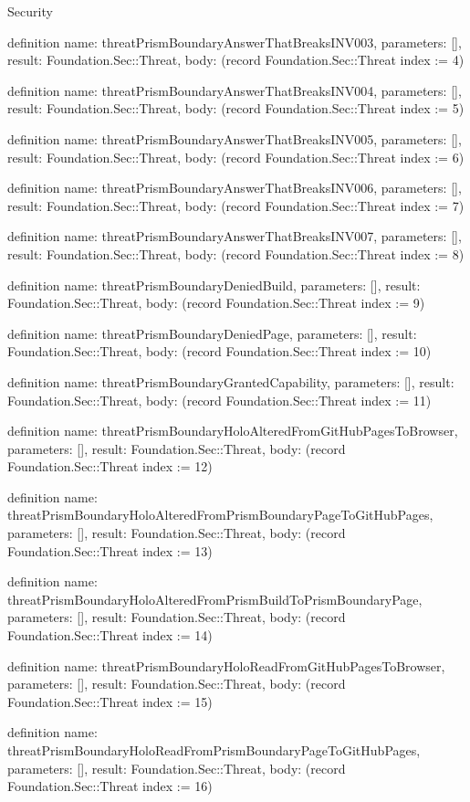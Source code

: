 \begin{lexlean}{Security}
\begin{semanticmodule}
definition{
  name: threatPrismBoundaryAnswerThatBreaksINV003,
  parameters: [],
  result: Foundation.Sec::Threat,
  body: (record Foundation.Sec::Threat {index := 4})
}

definition{
  name: threatPrismBoundaryAnswerThatBreaksINV004,
  parameters: [],
  result: Foundation.Sec::Threat,
  body: (record Foundation.Sec::Threat {index := 5})
}

definition{
  name: threatPrismBoundaryAnswerThatBreaksINV005,
  parameters: [],
  result: Foundation.Sec::Threat,
  body: (record Foundation.Sec::Threat {index := 6})
}

definition{
  name: threatPrismBoundaryAnswerThatBreaksINV006,
  parameters: [],
  result: Foundation.Sec::Threat,
  body: (record Foundation.Sec::Threat {index := 7})
}

definition{
  name: threatPrismBoundaryAnswerThatBreaksINV007,
  parameters: [],
  result: Foundation.Sec::Threat,
  body: (record Foundation.Sec::Threat {index := 8})
}

definition{
  name: threatPrismBoundaryDeniedBuild,
  parameters: [],
  result: Foundation.Sec::Threat,
  body: (record Foundation.Sec::Threat {index := 9})
}

definition{
  name: threatPrismBoundaryDeniedPage,
  parameters: [],
  result: Foundation.Sec::Threat,
  body: (record Foundation.Sec::Threat {index := 10})
}

definition{
  name: threatPrismBoundaryGrantedCapability,
  parameters: [],
  result: Foundation.Sec::Threat,
  body: (record Foundation.Sec::Threat {index := 11})
}

definition{
  name: threatPrismBoundaryHoloAlteredFromGitHubPagesToBrowser,
  parameters: [],
  result: Foundation.Sec::Threat,
  body: (record Foundation.Sec::Threat {index := 12})
}

definition{
  name: threatPrismBoundaryHoloAlteredFromPrismBoundaryPageToGitHubPages,
  parameters: [],
  result: Foundation.Sec::Threat,
  body: (record Foundation.Sec::Threat {index := 13})
}

definition{
  name: threatPrismBoundaryHoloAlteredFromPrismBuildToPrismBoundaryPage,
  parameters: [],
  result: Foundation.Sec::Threat,
  body: (record Foundation.Sec::Threat {index := 14})
}

definition{
  name: threatPrismBoundaryHoloReadFromGitHubPagesToBrowser,
  parameters: [],
  result: Foundation.Sec::Threat,
  body: (record Foundation.Sec::Threat {index := 15})
}

definition{
  name: threatPrismBoundaryHoloReadFromPrismBoundaryPageToGitHubPages,
  parameters: [],
  result: Foundation.Sec::Threat,
  body: (record Foundation.Sec::Threat {index := 16})
}


\end{semanticmodule}
\end{lexlean}
